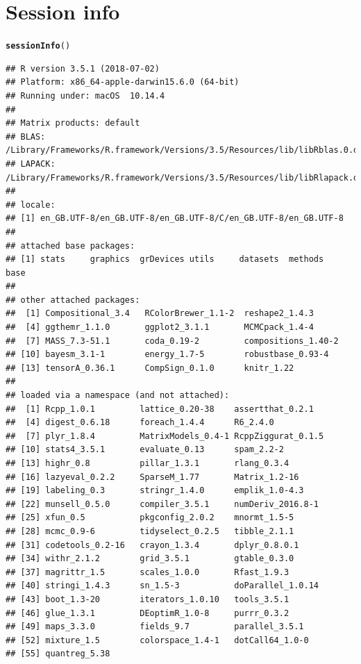 \documentclass{article}\usepackage[]{graphicx}\usepackage[]{color}
\makeatletter
\newcommand{\hlstd}[1]{\textcolor[rgb]{0.345,0.345,0.345}{#1}}%
\newcommand{\hlkwd}[1]{\textcolor[rgb]{0.737,0.353,0.396}{\textbf{#1}}}%
\newenvironment{kframe}{%
 \def\at@end@of@kframe{}%
 \ifinner\ifhmode%
  \def\at@end@of@kframe{\end{minipage}}%
  \begin{minipage}{\columnwidth}%
 \fi\fi%
 \def\FrameCommand##1{\hskip\@totalleftmargin \hskip-\fboxsep
 \colorbox{shadecolor}{##1}\hskip-\fboxsep
     \hskip-\linewidth \hskip-\@totalleftmargin \hskip\columnwidth}%
 \MakeFramed {\advance\hsize-\width
   \@totalleftmargin\z@ \linewidth\hsize
   \@setminipage}}%
 {\par\unskip\endMakeFramed%
 \at@end@of@kframe}
\newenvironment{knitrout}{}{} %
\makeatother
\begin{document}
\section{Session info}
\begin{knitrout}
\color{fgcolor}\begin{kframe}
\begin{alltt}
  \hlkwd{sessionInfo}\hlstd{()}
\end{alltt}
\begin{verbatim}
## R version 3.5.1 (2018-07-02)
## Platform: x86_64-apple-darwin15.6.0 (64-bit)
## Running under: macOS  10.14.4
## 
## Matrix products: default
## BLAS: /Library/Frameworks/R.framework/Versions/3.5/Resources/lib/libRblas.0.dylib
## LAPACK: /Library/Frameworks/R.framework/Versions/3.5/Resources/lib/libRlapack.dylib
## 
## locale:
## [1] en_GB.UTF-8/en_GB.UTF-8/en_GB.UTF-8/C/en_GB.UTF-8/en_GB.UTF-8
## 
## attached base packages:
## [1] stats     graphics  grDevices utils     datasets  methods   base     
## 
## other attached packages:
##  [1] Compositional_3.4   RColorBrewer_1.1-2  reshape2_1.4.3     
##  [4] ggthemr_1.1.0       ggplot2_3.1.1       MCMCpack_1.4-4     
##  [7] MASS_7.3-51.1       coda_0.19-2         compositions_1.40-2
## [10] bayesm_3.1-1        energy_1.7-5        robustbase_0.93-4  
## [13] tensorA_0.36.1      CompSign_0.1.0      knitr_1.22         
## 
## loaded via a namespace (and not attached):
##  [1] Rcpp_1.0.1         lattice_0.20-38    assertthat_0.2.1  
##  [4] digest_0.6.18      foreach_1.4.4      R6_2.4.0          
##  [7] plyr_1.8.4         MatrixModels_0.4-1 RcppZiggurat_0.1.5
## [10] stats4_3.5.1       evaluate_0.13      spam_2.2-2        
## [13] highr_0.8          pillar_1.3.1       rlang_0.3.4       
## [16] lazyeval_0.2.2     SparseM_1.77       Matrix_1.2-16     
## [19] labeling_0.3       stringr_1.4.0      emplik_1.0-4.3    
## [22] munsell_0.5.0      compiler_3.5.1     numDeriv_2016.8-1 
## [25] xfun_0.5           pkgconfig_2.0.2    mnormt_1.5-5      
## [28] mcmc_0.9-6         tidyselect_0.2.5   tibble_2.1.1      
## [31] codetools_0.2-16   crayon_1.3.4       dplyr_0.8.0.1     
## [34] withr_2.1.2        grid_3.5.1         gtable_0.3.0      
## [37] magrittr_1.5       scales_1.0.0       Rfast_1.9.3       
## [40] stringi_1.4.3      sn_1.5-3           doParallel_1.0.14 
## [43] boot_1.3-20        iterators_1.0.10   tools_3.5.1       
## [46] glue_1.3.1         DEoptimR_1.0-8     purrr_0.3.2       
## [49] maps_3.3.0         fields_9.7         parallel_3.5.1    
## [52] mixture_1.5        colorspace_1.4-1   dotCall64_1.0-0   
## [55] quantreg_5.38
\end{verbatim}
\end{kframe}
\end{knitrout}
\end{document}
